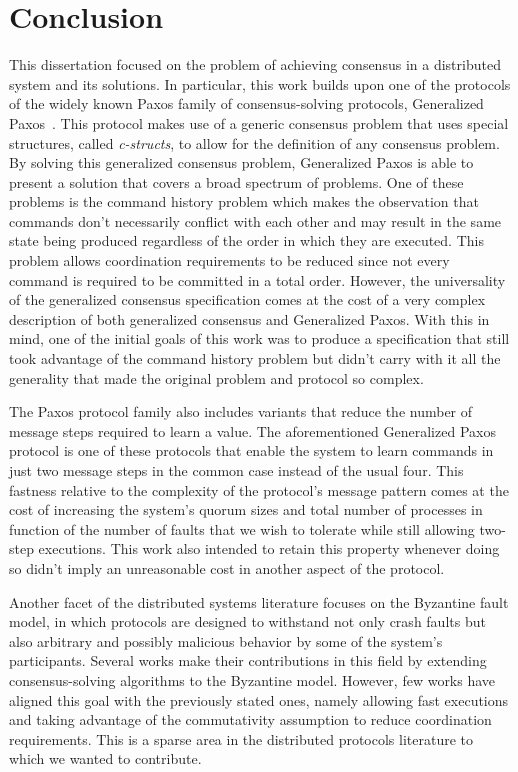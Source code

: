 \chapter{Conclusion} \label{conclusion}
This dissertation focused on the problem of achieving consensus in a distributed system and its solutions. In particular, this work builds upon one of the protocols of the widely known Paxos family of consensus-solving protocols, Generalized Paxos~\cite{Lamport2005}. This protocol makes use of a generic consensus problem that uses special structures, called \textit{c-structs}, to allow for the definition of any consensus problem. By solving this generalized consensus problem, Generalized Paxos is able to present a solution that covers a broad spectrum of problems. One of these problems is the command history problem which makes the observation that commands don't necessarily conflict with each other and may result in the same state being produced regardless of the order in which they are executed. This problem allows coordination requirements to be reduced since not every command is required to be committed in a total order. However, the universality of the generalized consensus specification comes at the cost of a very complex description of both generalized consensus and Generalized Paxos. With this in mind, one of the initial goals of this work was to produce a specification that still took advantage of the command history problem but didn't carry with it all the generality that made the original problem and protocol so complex. \par
The Paxos protocol family also includes variants that reduce the number of message steps required to learn a value. The aforementioned Generalized Paxos protocol is one of these protocols that enable the system to learn commands in just two message steps in the common case instead of the usual four. This fastness relative to the complexity of the protocol's message pattern comes at the cost of increasing the system's quorum sizes and total number of processes in function of the number of faults that we wish to tolerate while still allowing two-step executions. This work also intended to retain this property whenever doing so didn't imply an unreasonable cost in another aspect of the protocol. \par
Another facet of the distributed systems literature focuses on the Byzantine fault model, in which protocols are designed to withstand not only crash faults but also arbitrary and possibly malicious behavior by some of the system's participants. Several works make their contributions in this field by extending consensus-solving algorithms to the Byzantine model. However, few works have aligned this goal with the previously stated ones, namely allowing fast executions and taking advantage of the commutativity assumption to reduce coordination requirements. This is a sparse area in the distributed protocols literature to which we wanted to contribute.\par
